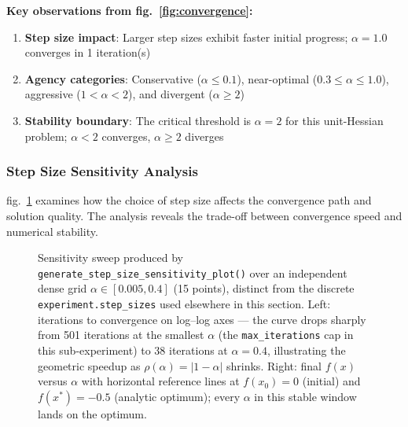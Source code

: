 \documentclass[
]{article}
\makeatletter
\newcommand*\pandocbounded[1]{%
  \sbox\pandoc@box{#1}%
  \Gscale@div\@tempa{\textheight}{\dimexpr\ht\pandoc@box+\dp\pandoc@box\relax}%
  \Gscale@div\@tempb{\linewidth}{\wd\pandoc@box}%
  \ifdim\@tempb\p@<\@tempa\p@\let\@tempa\@tempb\fi%
  \ifdim\@tempa\p@<\p@\scalebox{\@tempa}{\usebox\pandoc@box}%
  \else\usebox{\pandoc@box}%
  \fi%
}
\providecommand{\tightlist}{%
  \setlength{\itemsep}{0pt}\setlength{\parskip}{0pt}}
\makeatother
\begin{document}
\textbf{Key observations from fig.~\ref{fig:convergence}:}

\begin{enumerate}
\def\labelenumi{\arabic{enumi}.}
\tightlist
\item
  \textbf{Step size impact}: Larger step sizes exhibit faster initial
  progress; \(\alpha = 1.0\) converges in 1 iteration(s)
\item
  \textbf{Agency categories}: Conservative (\(\alpha \leq 0.1\)),
  near-optimal (\(0.3 \leq \alpha \leq 1.0\)), aggressive
  (\(1 < \alpha < 2\)), and divergent (\(\alpha \geq 2\))
\item
  \textbf{Stability boundary}: The critical threshold is \(\alpha = 2\)
  for this unit-Hessian problem; \(\alpha < 2\) converges,
  \(\alpha \geq 2\) diverges
\end{enumerate}

\subsubsection{Step Size Sensitivity
Analysis}\label{step-size-sensitivity-analysis}

fig.~\ref{fig:step_sensitivity} examines how the choice of step size
affects the convergence path and solution quality. The analysis reveals
the trade-off between convergence speed and numerical stability.

\begin{figure}
\centering
\pandocbounded{\includegraphics[keepaspectratio,alt={Sensitivity sweep produced by generate\_step\_size\_sensitivity\_plot() over an independent dense grid \textbackslash alpha \textbackslash in \[0.005, 0.4\] (15 points), distinct from the discrete experiment.step\_sizes used elsewhere in this section. Left: iterations to convergence on log--log axes --- the curve drops sharply from 501 iterations at the smallest \textbackslash alpha (the max\_iterations cap in this sub-experiment) to 38 iterations at \textbackslash alpha=0.4, illustrating the geometric speedup as \textbackslash rho(\textbackslash alpha)=\mid1-\textbackslash alpha\mid{} shrinks. Right: final f(x) versus \textbackslash alpha with horizontal reference lines at f(x\_0)=0 (initial) and f(x\^{}\textbackslash ast)=-0.5 (analytic optimum); every \textbackslash alpha in this stable window lands on the optimum.}]{../figures/step_size_sensitivity.png}}
\caption{Sensitivity sweep produced by
\protect\texttt{generate\_step\_size\_sensitivity\_plot()} over an
independent dense grid \(\alpha \in [0.005, 0.4]\) (15 points), distinct
from the discrete \protect\texttt{experiment.step\_sizes} used elsewhere
in this section. Left: iterations to convergence on log--log axes ---
the curve drops sharply from 501 iterations at the smallest \(\alpha\)
(the \protect\texttt{max\_iterations} cap in this sub-experiment) to 38
iterations at \(\alpha=0.4\), illustrating the geometric speedup as
\(\rho(\alpha)=|1-\alpha|\) shrinks. Right: final \(f(x)\) versus
\(\alpha\) with horizontal reference lines at \(f(x_0)=0\) (initial) and
\(f(x^\ast)=-0.5\) (analytic optimum); every \(\alpha\) in this stable
window lands on the optimum.}\label{fig:step_sensitivity}
\end{figure}
\end{document}
